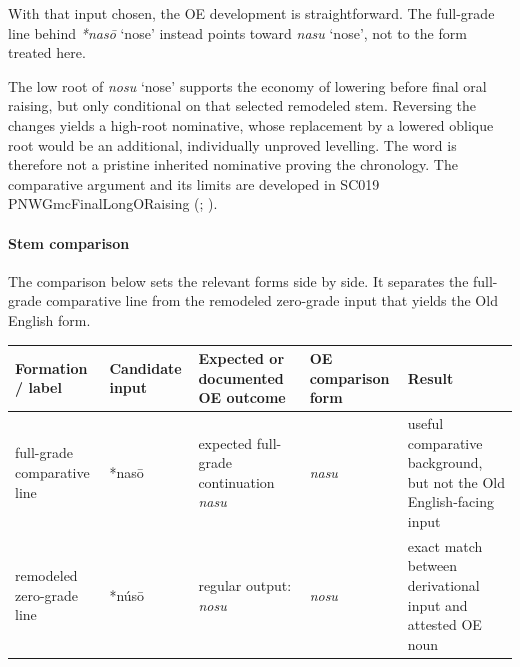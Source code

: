 \documentclass[
  british,
  a4paper,
]{article}
\newcounter{none} %
\providecommand{\Recon}[1]{\emph{*#1}}
\begin{document}
With that input chosen, the OE development is straightforward. The
full-grade line behind \Recon{nasō} `nose' instead points toward
{\emph{nasu}} `nose', not to the form treated here.

The low root of \emph{nosu} `nose' supports the economy of lowering
before final oral raising, but only conditional on that selected
remodeled stem. Reversing the changes yields a high-root nominative,
whose replacement by a lowered oblique root would be an additional,
individually unproved levelling. The word is therefore not a pristine
inherited nominative proving the chronology. The comparative argument
and its limits are developed in SC019 PNWGmcFinalLongORaising
(;
).

\paragraph{Stem comparison}\label{stem-comparison-4}

The comparison below sets the relevant forms side by side. It separates
the full-grade comparative line from the remodeled zero-grade input that
yields the Old English form.

{\def\LTcaptype{none} %
\begin{longtable}[]{@{}
  >{\raggedright\arraybackslash}p{}
  >{\raggedright\arraybackslash}p{}
  >{\raggedright\arraybackslash}p{}
  >{\raggedright\arraybackslash}p{}
  >{\raggedright\arraybackslash}p{}@{}}
\toprule\noalign{}
\begin{minipage}[b]{\linewidth}\raggedright
Formation / label
\end{minipage} & \begin{minipage}[b]{\linewidth}\raggedright
Candidate input
\end{minipage} & \begin{minipage}[b]{\linewidth}\raggedright
Expected or documented OE outcome
\end{minipage} & \begin{minipage}[b]{\linewidth}\raggedright
OE comparison form
\end{minipage} & \begin{minipage}[b]{\linewidth}\raggedright
Result
\end{minipage} \\
\midrule\noalign{}
\endhead
\bottomrule\noalign{}
\endlastfoot
full-grade comparative line & *nasō & expected full-grade continuation
\emph{nasu} & \emph{nasu} & useful comparative background, but not the
Old English-facing input \\
remodeled zero-grade line & *núsō & regular output: \emph{nosu} &
\emph{nosu} & exact match between derivational input and attested OE
noun \\
\end{longtable}
}
\end{document}
